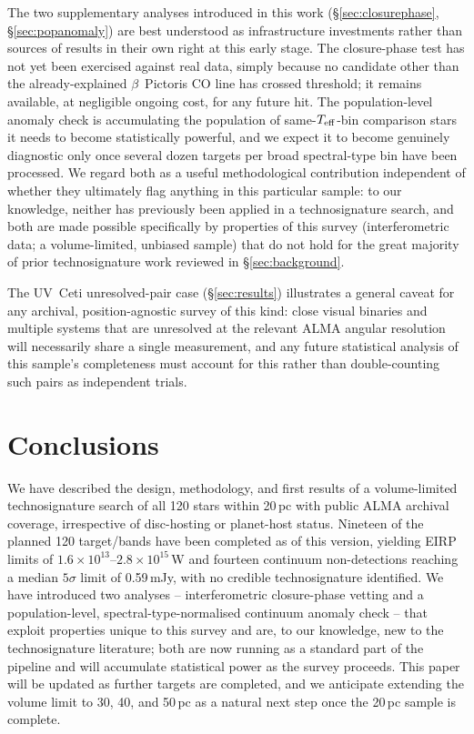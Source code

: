 \documentclass{openjournal}
\begin{document}
The two supplementary analyses introduced in this work
(\S\ref{sec:closurephase}, \S\ref{sec:popanomaly}) are best understood as
infrastructure investments rather than sources of results in their own
right at this early stage. The closure-phase test has not yet been
exercised against real data, simply because no candidate other than the
already-explained $\beta$~Pictoris CO line has crossed threshold; it
remains available, at negligible ongoing cost, for any future hit. The
population-level anomaly check is accumulating the population of
same-$T_{\rm eff}$-bin comparison stars it needs to become statistically
powerful, and we expect it to become genuinely diagnostic only once
several dozen targets per broad spectral-type bin have been processed.
We regard both as a useful methodological contribution independent of
whether they ultimately flag anything in this particular sample: to our
knowledge, neither has previously been applied in a technosignature
search, and both are made possible specifically by properties of this
survey (interferometric data; a volume-limited, unbiased sample) that do
not hold for the great majority of prior technosignature work reviewed in
\S\ref{sec:background}.

The UV~Ceti unresolved-pair case (\S\ref{sec:results}) illustrates a
general caveat for any archival, position-agnostic survey of this kind:
close visual binaries and multiple systems that are unresolved at the
relevant ALMA angular resolution will necessarily share a single
measurement, and any future statistical analysis of this sample's
completeness must account for this rather than double-counting such
pairs as independent trials.

\section{Conclusions}
\label{sec:conclusions}

We have described the design, methodology, and first results of a
volume-limited technosignature search of all 120 stars within 20\,pc
with public ALMA archival coverage, irrespective of disc-hosting or
planet-host status. Nineteen of the planned 120 target/bands have been
completed as of this version, yielding EIRP limits of
$1.6\times10^{13}$--$2.8\times10^{15}$\,W and fourteen continuum
non-detections reaching a median $5\sigma$ limit of 0.59\,mJy, with no
credible technosignature identified. We have introduced two analyses
-- interferometric closure-phase vetting and a population-level,
spectral-type-normalised continuum anomaly check -- that exploit
properties unique to this survey and are, to our knowledge, new to the
technosignature literature; both are now running as a standard part of
the pipeline and will accumulate statistical power as the survey
proceeds. This paper will be updated as further targets are completed,
and we anticipate extending the volume limit to 30, 40, and 50\,pc as a
natural next step once the 20\,pc sample is complete.
\end{document}
